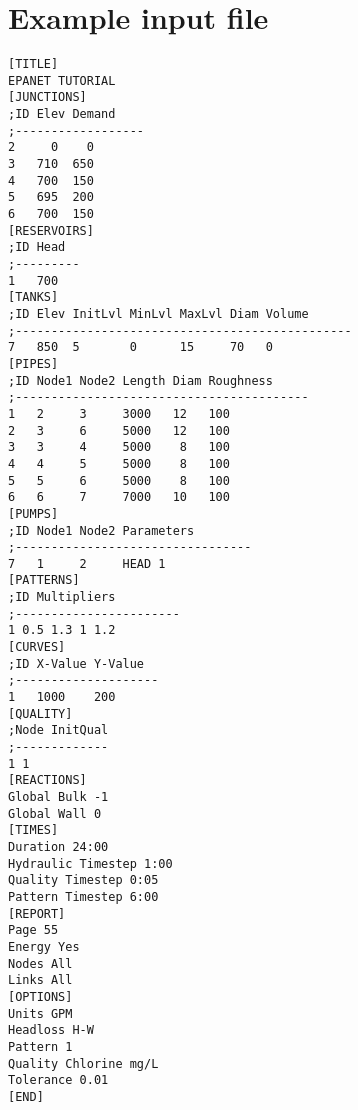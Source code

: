 \chapter{Example input file}
\begin{verbatim}
[TITLE]
EPANET TUTORIAL
[JUNCTIONS]
;ID Elev Demand
;------------------
2     0    0
3   710  650
4   700  150
5   695  200
6   700  150
[RESERVOIRS]
;ID Head
;---------
1   700
[TANKS]
;ID Elev InitLvl MinLvl MaxLvl Diam Volume
;-----------------------------------------------
7   850  5       0      15     70   0
[PIPES]
;ID Node1 Node2 Length Diam Roughness
;-----------------------------------------
1   2     3     3000   12   100
2   3     6     5000   12   100
3   3     4     5000    8   100
4   4     5     5000    8   100
5   5     6     5000    8   100
6   6     7     7000   10   100
[PUMPS]
;ID Node1 Node2 Parameters
;---------------------------------
7   1     2     HEAD 1
[PATTERNS]
;ID Multipliers
;-----------------------
1 0.5 1.3 1 1.2
[CURVES]
;ID X-Value Y-Value
;--------------------
1   1000    200
[QUALITY]
;Node InitQual
;-------------
1 1
[REACTIONS]
Global Bulk -1
Global Wall 0
[TIMES]
Duration 24:00
Hydraulic Timestep 1:00
Quality Timestep 0:05
Pattern Timestep 6:00
[REPORT]
Page 55
Energy Yes
Nodes All
Links All
[OPTIONS]
Units GPM
Headloss H-W
Pattern 1
Quality Chlorine mg/L
Tolerance 0.01
[END]
\end{verbatim}